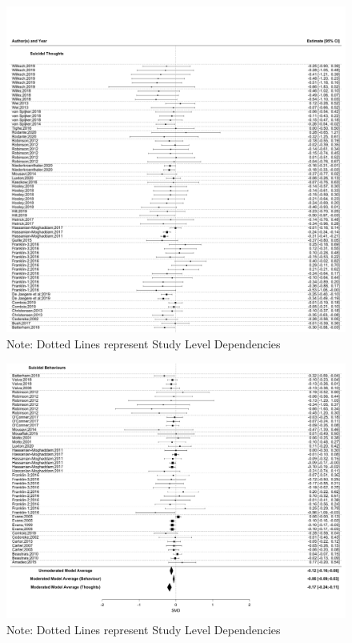 \documentclass[
  english,
  man]{apa6}
\begin{document}
\begin{figure}
\centering
\includegraphics{01_Plots_Tables/Forest_Plot_1.png}
\caption{Note: Dotted Lines represent Study Level Dependencies}
\end{figure}

\begin{figure}
\centering
\includegraphics{01_Plots_Tables/Forest_Plot_2.png}
\caption{Note: Dotted Lines represent Study Level Dependencies}
\end{figure}
\end{document}
